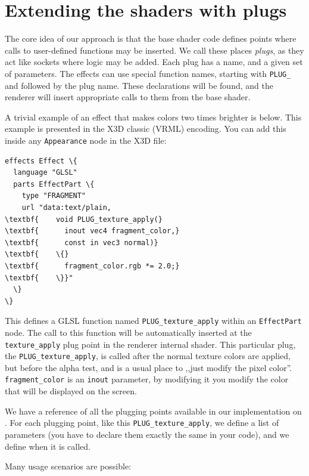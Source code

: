 \documentclass{egpubl}
\begin{document}
\section{Extending the shaders with plugs}

The core idea of our approach is that the base shader code defines
points where calls to user-defined functions may be inserted. We call
these places \textit{plugs}, as they act like sockets where logic
may be added. Each plug has a name, and a given set of parameters.
The effects can use special function names, starting with \texttt{PLUG\_}
and followed by the plug name. These declarations will be found,
and the renderer will insert appropriate calls to them from the base shader.

A trivial example of an effect that makes colors two times brighter
is below. This example is presented in the X3D classic (VRML) encoding.
You can add this inside any \texttt{Appearance} node in the X3D file:

\begin{Verbatim}[commandchars=\\\{\},frame=single,fontsize=\small]
effects Effect \{
  language "GLSL"
  parts EffectPart \{
    type "FRAGMENT"
    url "data:text/plain,
\textbf{    void PLUG_texture_apply(}
\textbf{      inout vec4 fragment_color,}
\textbf{      const in vec3 normal)}
\textbf{    \{}
\textbf{      fragment_color.rgb *= 2.0;}
\textbf{    \}}"
  \}
\}
\end{Verbatim}

This defines a GLSL function named \texttt{PLUG\_texture\_apply}
within an \texttt{EffectPart} node. The call to this function will
be automatically inserted at the \texttt{texture\_apply} plug point in
the renderer internal shader. This particular plug,
the \texttt{PLUG\_texture\_apply}, is called after the normal texture colors
are applied, but before the alpha test, and is a usual place to ,,just modify the pixel color''.
\texttt{fragment\_color} is an \texttt{inout} parameter, by modifying it
you modify the color that will be displayed on the screen.

We have a reference of all the plugging points available in our implementation
on .
For each plugging point,
like this \texttt{PLUG\_texture\_apply}, we define a list of parameters
(you have to declare them exactly the same in your code), and we define
when it is called.

\needspace{1in}
Many usage scenarios are possible:
\end{document}
